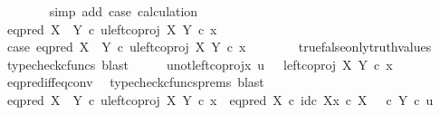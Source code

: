 \begin{isabellebody}
\ \ \ \ \ \ \isamarkupfalse%
\ {\isacharparenleft}{\kern0pt}simp\ add{\isacharcolon}{\kern0pt}\ case{}\ calculation{\isacharparenright}{\kern0pt}\isanewline
\ \ \isamarkupfalse%
\isanewline
{}\isamarkupfalse%
\isanewline
\ \ \isamarkupfalse%
\ {\isachardoublequoteopen}eq{\isacharunderscore}{\kern0pt}pred\ {\isacharparenleft}{\kern0pt}X\ {\isasymCoprod}\ Y{\isacharparenright}{\kern0pt}\ {\isasymcirc}\isactrlsub c\ {\isasymlangle}u{\isacharcomma}{\kern0pt}left{\isacharunderscore}{\kern0pt}coproj\ X\ Y\ {\isasymcirc}\isactrlsub c\ x{\isasymrangle}\ {\isasymnoteq}\ {\isasymt}{\isachardoublequoteclose}\isanewline
\ \ \isamarkupfalse%
\ \isamarkupfalse%
\ case{}{\isacharcolon}{\kern0pt}\ {\isachardoublequoteopen}eq{\isacharunderscore}{\kern0pt}pred\ {\isacharparenleft}{\kern0pt}X\ {\isasymCoprod}\ Y{\isacharparenright}{\kern0pt}\ {\isasymcirc}\isactrlsub c\ {\isasymlangle}u{\isacharcomma}{\kern0pt}left{\isacharunderscore}{\kern0pt}coproj\ X\ Y\ {\isasymcirc}\isactrlsub c\ x{\isasymrangle}\ {\isacharequal}{\kern0pt}\ {\isasymf}{\isachardoublequoteclose}\isanewline
\ \ \ \ \isamarkupfalse%
\ true{\isacharunderscore}{\kern0pt}false{\isacharunderscore}{\kern0pt}only{\isacharunderscore}{\kern0pt}truth{\isacharunderscore}{\kern0pt}values\ \isamarkupfalse%
\ {\isacharparenleft}{\kern0pt}typecheck{\isacharunderscore}{\kern0pt}cfuncs{\isacharcomma}{\kern0pt}\ blast{\isacharparenright}{\kern0pt}\isanewline
\ \ \isamarkupfalse%
\ \isamarkupfalse%
\ u{\isacharunderscore}{\kern0pt}not{\isacharunderscore}{\kern0pt}left{\isacharunderscore}{\kern0pt}coproj{\isacharunderscore}{\kern0pt}x{\isacharcolon}{\kern0pt}\ {\isachardoublequoteopen}u\ \ {\isasymnoteq}\ left{\isacharunderscore}{\kern0pt}coproj\ X\ Y\ {\isasymcirc}\isactrlsub c\ x{\isachardoublequoteclose}\isanewline
\ \ \ \ \isamarkupfalse%
\ eq{\isacharunderscore}{\kern0pt}pred{\isacharunderscore}{\kern0pt}iff{\isacharunderscore}{\kern0pt}eq{\isacharunderscore}{\kern0pt}conv\ \isamarkupfalse%
\ {\isacharparenleft}{\kern0pt}typecheck{\isacharunderscore}{\kern0pt}cfuncs{\isacharunderscore}{\kern0pt}prems{\isacharcomma}{\kern0pt}\ blast{\isacharparenright}{\kern0pt}\isanewline
\ \ \isamarkupfalse%
\ {\isachardoublequoteopen}eq{\isacharunderscore}{\kern0pt}pred\ {\isacharparenleft}{\kern0pt}X\ {\isasymCoprod}\ Y{\isacharparenright}{\kern0pt}\ {\isasymcirc}\isactrlsub c\ {\isasymlangle}u{\isacharcomma}{\kern0pt}left{\isacharunderscore}{\kern0pt}coproj\ X\ Y\ {\isasymcirc}\isactrlsub c\ x{\isasymrangle}\ {\isacharequal}{\kern0pt}\ {\isacharparenleft}{\kern0pt}eq{\isacharunderscore}{\kern0pt}pred\ X\ {\isasymcirc}\isactrlsub c\ {\isasymlangle}id\isactrlsub c\ X{\isacharcomma}{\kern0pt}x\ {\isasymcirc}\isactrlsub c\ {\isasymbeta}\isactrlbsub X\isactrlesub {\isasymrangle}{\isacharparenright}{\kern0pt}\ {\isasymamalg}\ {\isacharparenleft}{\kern0pt}{\isasymf}\ {\isasymcirc}\isactrlsub c\ {\isasymbeta}\isactrlbsub Y\isactrlesub {\isacharparenright}{\kern0pt}\ {\isasymcirc}\isactrlsub c\ u{\isachardoublequoteclose}\isanewline

\end{isabellebody}
